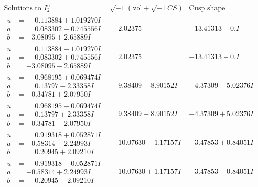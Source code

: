 \documentclass[1p]{elsarticle_modified}
\theoremstyle{definition}
\newcommand{\I}{\sqrt{-1}}
\begin{document}
$$\begin{array}{c|c|c}  
\text{Solutions to }I^u_{2}& \I (\text{vol} + \sqrt{-1}CS) & \text{Cusp shape}\\
 \hline 
\begin{aligned}
u &= \phantom{-}0.113884 + 1.019270 I \\
a &= \phantom{-}0.083302 - 0.745556 I \\
b &= -3.08095 + 2.65889 I\end{aligned}
 & \phantom{-}2.02375\phantom{ +0.000000I} & -13.41313 + 0. I\phantom{ +0.000000I} \\ \hline\begin{aligned}
u &= \phantom{-}0.113884 - 1.019270 I \\
a &= \phantom{-}0.083302 + 0.745556 I \\
b &= -3.08095 - 2.65889 I\end{aligned}
 & \phantom{-}2.02375\phantom{ +0.000000I} & -13.41313 + 0. I\phantom{ +0.000000I} \\ \hline\begin{aligned}
u &= \phantom{-}0.968195 + 0.069474 I \\
a &= \phantom{-}0.13797 - 2.33358 I \\
b &= -0.34781 + 2.07950 I\end{aligned}
 & \phantom{-}9.38409 + 8.90152 I & -4.37309 - 5.02376 I \\ \hline\begin{aligned}
u &= \phantom{-}0.968195 - 0.069474 I \\
a &= \phantom{-}0.13797 + 2.33358 I \\
b &= -0.34781 - 2.07950 I\end{aligned}
 & \phantom{-}9.38409 - 8.90152 I & -4.37309 + 5.02376 I \\ \hline\begin{aligned}
u &= \phantom{-}0.919318 + 0.052871 I \\
a &= -0.58314 - 2.24993 I \\
b &= \phantom{-}0.20945 + 2.09210 I\end{aligned}
 & \phantom{-}10.07630 - 1.17157 I & -3.47853 + 0.84051 I \\ \hline\begin{aligned}
u &= \phantom{-}0.919318 - 0.052871 I \\
a &= -0.58314 + 2.24993 I \\
b &= \phantom{-}0.20945 - 2.09210 I\end{aligned}
 & \phantom{-}10.07630 + 1.17157 I & -3.47853 - 0.84051 I \\ \hline\begin{aligned}

\end{aligned}
\end{array}$$
\end{document}
